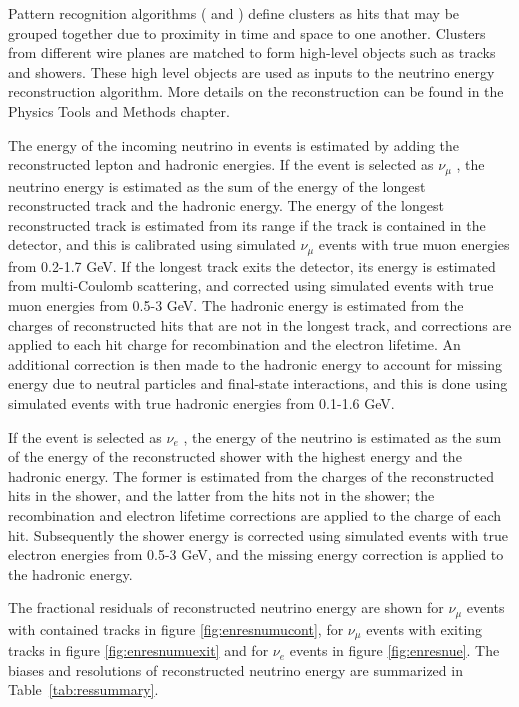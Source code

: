 Pattern recognition algorithms ( and ) define clusters as hits that may be grouped together due to proximity in time and space to one another. Clusters from different wire planes are matched to form high-level objects such as tracks and showers. These high level objects are used as inputs to the neutrino energy reconstruction algorithm. More details on the reconstruction can be found in the Physics Tools and Methods chapter.


The energy of the incoming neutrino in  events is estimated by adding the reconstructed lepton and hadronic energies. 
If the event is selected as $\nu_{\mu}$ , the neutrino energy is estimated as the sum of the energy of the longest reconstructed track and the hadronic energy. The energy of the longest reconstructed track is estimated from its range if the track is contained in the detector, and this is calibrated using simulated $\nu_{\mu}$  events with true muon energies from 0.2-1.7 GeV. If the longest track exits the detector, its energy is estimated from multi-Coulomb scattering, and corrected using simulated events with true muon energies from 0.5-3 GeV. The hadronic energy is estimated from the charges of reconstructed hits that 
are not in the longest track, and corrections are applied to each hit charge for recombination and the electron lifetime. An additional correction is then made to the hadronic energy to account for missing energy due to neutral particles and final-state interactions, and this is done using simulated events with true hadronic energies from 0.1-1.6 GeV. 

If the event is selected as $\nu_{e}$ , the energy of the 
neutrino is estimated as the sum of the energy of the reconstructed shower with the highest energy and the hadronic energy. The former is estimated from the charges of the reconstructed hits in the shower, and the latter from the hits not in the shower; the recombination and electron lifetime corrections are applied to the charge of each hit. Subsequently the shower energy is corrected using simulated events with true electron energies from 0.5-3 GeV, and the missing energy correction is applied to the hadronic energy.

The fractional residuals of reconstructed neutrino energy are shown for $\nu_{\mu}$  events with contained tracks in figure \ref{fig:enresnumucont}, for $\nu_{\mu}$  events with exiting tracks in figure \ref{fig:enresnumuexit} and for $\nu_{e}$  events in figure \ref{fig:enresnue}. The biases and resolutions of reconstructed neutrino energy are summarized in Table~\ref{tab:ressummary}.

